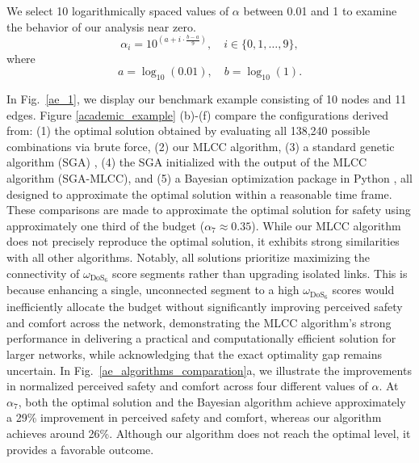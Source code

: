 \documentclass[lettersize,journal]{IEEEtran}
\begin{document}
We select 10 logarithmically spaced values of $\alpha$ between 0.01 and 1 to examine the behavior of our analysis near zero.
\begin{equation}
\alpha_i = 10^{\left(a + i \cdot \frac{b - a}{9}\right)}, \quad i \in \{0, 1, \dots, 9\},    
\end{equation}
where
\begin{equation}
    a = \log_{10}(0.01), \quad b = \log_{10}(1).
\end{equation}

In Fig.~\ref{ae_1}, we display our benchmark example consisting of 10 nodes and 11 edges. Figure \ref{academic_example} (b)-(f) compare the configurations derived from: (1) the optimal solution obtained by evaluating all 138,240 possible combinations via brute force, (2) our MLCC algorithm, (3) a standard genetic algorithm (SGA) \cite{pygmo}, (4) the SGA initialized with the output of the MLCC algorithm (SGA-MLCC), and (5) a Bayesian optimization package in Python \cite{bayesian_2014}, all designed to approximate the optimal solution within a reasonable time frame. These comparisons are made to approximate the optimal solution for safety using approximately one third of the budget ($\alpha_{7} \approx 0.35$). While our MLCC algorithm does not precisely reproduce the optimal solution, it exhibits strong similarities with all other algorithms. Notably, all solutions prioritize maximizing the connectivity of $\omega_{\text{DoS}_6}$ score segments rather than upgrading isolated links. This is because enhancing a single, unconnected segment to a high $\omega_{\text{DoS}_6}$ scores would inefficiently allocate the budget without significantly improving perceived safety and comfort across the network,  demonstrating the MLCC algorithm's strong performance in delivering a practical and computationally efficient solution for larger networks, while acknowledging that the exact optimality gap remains uncertain.
In Fig.~\ref{ae_algorithms_comparation}a, we illustrate the improvements in normalized perceived safety and comfort across four different values of $\alpha$. At $\alpha_{7}$, both the optimal solution and the Bayesian algorithm achieve approximately a 29\% improvement in perceived safety and comfort, whereas our algorithm achieves around 26\%. Although our algorithm does not reach the optimal level, it provides a favorable outcome. 
\end{document}

